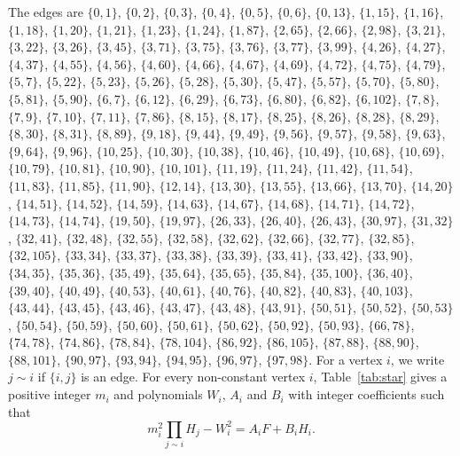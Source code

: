 \documentclass[11pt]{article}
\begin{document}
The edges are $\{0,1\}$, $\{0,2\}$, $\{0,3\}$, $\{0,4\}$, $\{0,5\}$, $\{0,6\}$, $\{0,13\}$, $\{1,15\}$, $\{1,16\}$, $\{1,18\}$, $\{1,20\}$, $\{1,21\}$, $\{1,23\}$, $\{1,24\}$, $\{1,87\}$, $\{2,65\}$, $\{2,66\}$, $\{2,98\}$, $\{3,21\}$, $\{3,22\}$, $\{3,26\}$, $\{3,45\}$, $\{3,71\}$, $\{3,75\}$, $\{3,76\}$, $\{3,77\}$, $\{3,99\}$, $\{4,26\}$, $\{4,27\}$, $\{4,37\}$, $\{4,55\}$, $\{4,56\}$, $\{4,60\}$, $\{4,66\}$, $\{4,67\}$, $\{4,69\}$, $\{4,72\}$, $\{4,75\}$, $\{4,79\}$, $\{5,7\}$, $\{5,22\}$, $\{5,23\}$, $\{5,26\}$, $\{5,28\}$, $\{5,30\}$, $\{5,47\}$, $\{5,57\}$, $\{5,70\}$, $\{5,80\}$, $\{5,81\}$, $\{5,90\}$, $\{6,7\}$, $\{6,12\}$, $\{6,29\}$, $\{6,73\}$, $\{6,80\}$, $\{6,82\}$, $\{6,102\}$, $\{7,8\}$, $\{7,9\}$, $\{7,10\}$, $\{7,11\}$, $\{7,86\}$, $\{8,15\}$, $\{8,17\}$, $\{8,25\}$, $\{8,26\}$, $\{8,28\}$, $\{8,29\}$, $\{8,30\}$, $\{8,31\}$, $\{8,89\}$, $\{9,18\}$, $\{9,44\}$, $\{9,49\}$, $\{9,56\}$, $\{9,57\}$, $\{9,58\}$, $\{9,63\}$, $\{9,64\}$, $\{9,96\}$, $\{10,25\}$, $\{10,30\}$, $\{10,38\}$, $\{10,46\}$, $\{10,49\}$, $\{10,68\}$, $\{10,69\}$, $\{10,79\}$, $\{10,81\}$, $\{10,90\}$, $\{10,101\}$, $\{11,19\}$, $\{11,24\}$, $\{11,42\}$, $\{11,54\}$, $\{11,83\}$, $\{11,85\}$, $\{11,90\}$, $\{12,14\}$, $\{13,30\}$, $\{13,55\}$, $\{13,66\}$, $\{13,70\}$, $\{14,20\}$, $\{14,51\}$, $\{14,52\}$, $\{14,59\}$, $\{14,63\}$, $\{14,67\}$, $\{14,68\}$, $\{14,71\}$, $\{14,72\}$, $\{14,73\}$, $\{14,74\}$, $\{19,50\}$, $\{19,97\}$, $\{26,33\}$, $\{26,40\}$, $\{26,43\}$, $\{30,97\}$, $\{31,32\}$, $\{32,41\}$, $\{32,48\}$, $\{32,55\}$, $\{32,58\}$, $\{32,62\}$, $\{32,66\}$, $\{32,77\}$, $\{32,85\}$, $\{32,105\}$, $\{33,34\}$, $\{33,37\}$, $\{33,38\}$, $\{33,39\}$, $\{33,41\}$, $\{33,42\}$, $\{33,90\}$, $\{34,35\}$, $\{35,36\}$, $\{35,49\}$, $\{35,64\}$, $\{35,65\}$, $\{35,84\}$, $\{35,100\}$, $\{36,40\}$, $\{39,40\}$, $\{40,49\}$, $\{40,53\}$, $\{40,61\}$, $\{40,76\}$, $\{40,82\}$, $\{40,83\}$, $\{40,103\}$, $\{43,44\}$, $\{43,45\}$, $\{43,46\}$, $\{43,47\}$, $\{43,48\}$, $\{43,91\}$, $\{50,51\}$, $\{50,52\}$, $\{50,53\}$, $\{50,54\}$, $\{50,59\}$, $\{50,60\}$, $\{50,61\}$, $\{50,62\}$, $\{50,92\}$, $\{50,93\}$, $\{66,78\}$, $\{74,78\}$, $\{74,86\}$, $\{78,84\}$, $\{78,104\}$, $\{86,92\}$, $\{86,105\}$, $\{87,88\}$, $\{88,90\}$, $\{88,101\}$, $\{90,97\}$, $\{93,94\}$, $\{94,95\}$, $\{96,97\}$, $\{97,98\}$. For a vertex $i$, we write $j\sim i$ if $\{i,j\}$ is an edge.
For every non-constant vertex $i$, Table~\ref{tab:star} gives a positive integer $m_{i}$ and polynomials $W_{i}$, $A_{i}$ and $B_{i}$ with integer coefficients such that
\begin{equation}\label{eq:star}
m_i^2\prod_{j\sim i}H_j-W_i^2=A_iF+B_iH_i.
\end{equation}
\end{document}
